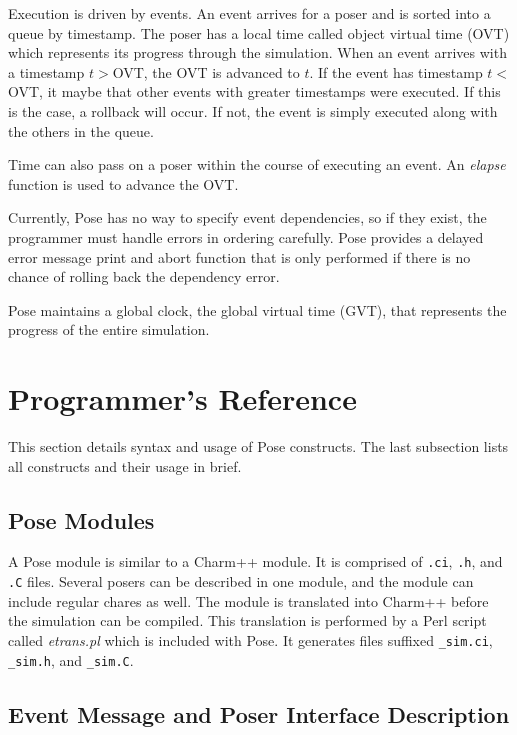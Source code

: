 \documentclass[10pt]{article}
\newcommand{\pose}{{\sc Pose}}
\begin{document}
Execution is driven by events.  An event arrives for a poser and is
sorted into a queue by timestamp.  The poser has a local time called
object virtual time (OVT) which represents its progress through the
simulation.  When an event arrives with a timestamp $t>$OVT, the OVT is
advanced to $t$.  If the event has timestamp $t<$OVT, it maybe that
other events with greater timestamps were executed.  If this is the
case, a rollback will occur.  If not, the event is simply executed
along with the others in the queue.

Time can also pass on a poser within the course of executing an
event.  An {\sl elapse} function is used to advance the OVT.  

Currently, \pose{} has no way to specify event dependencies, so if
they exist, the programmer must handle errors in ordering carefully.
\pose{} provides a delayed error message print and abort function that
is only performed if there is no chance of rolling back the dependency
error. 

\pose{} maintains a global clock, the global virtual time (GVT), that
represents the progress of the entire simulation.  

\section{Programmer's Reference}

This section details syntax and usage of \pose{} constructs.  The last
subsection lists all constructs and their usage in brief.

\subsection{\pose{} Modules}

A \pose{} module is similar to a Charm++ module.  It is comprised of
{\tt .ci}, {\tt .h}, and {\tt .C} files.  Several posers can be
described in one module, and the module can include regular chares as
well.  The module is translated into Charm++ before the simulation can
be compiled.  This translation is performed by a Perl script called
{\sl etrans.pl} which is included with \pose{}.  It generates files
suffixed {\tt \_sim.ci}, {\tt \_sim.h}, and {\tt \_sim.C}.  

\subsection{Event Message and Poser Interface Description}
\end{document}
